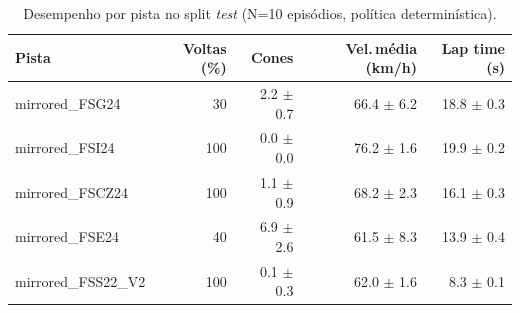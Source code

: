 \begin{table}[H]
\centering
\caption{Desempenho por pista no split \textit{test} (N=10 episódios, política determinística).}
\label{tab:per_track_test}
\begin{tabular}{lrrrr}
\toprule
\textbf{Pista} & \textbf{Voltas (\%)} & \textbf{Cones} & \textbf{Vel.\,m\'edia (km/h)} & \textbf{Lap time (s)} \\
\midrule
mirrored_FSG24 & 30 & 2.2 $\pm$ 0.7 & 66.4 $\pm$ 6.2 & 18.8 $\pm$ 0.3 \\
mirrored_FSI24 & 100 & 0.0 $\pm$ 0.0 & 76.2 $\pm$ 1.6 & 19.9 $\pm$ 0.2 \\
mirrored_FSCZ24 & 100 & 1.1 $\pm$ 0.9 & 68.2 $\pm$ 2.3 & 16.1 $\pm$ 0.3 \\
mirrored_FSE24 & 40 & 6.9 $\pm$ 2.6 & 61.5 $\pm$ 8.3 & 13.9 $\pm$ 0.4 \\
mirrored_FSS22_V2 & 100 & 0.1 $\pm$ 0.3 & 62.0 $\pm$ 1.6 & 8.3 $\pm$ 0.1 \\
\bottomrule
\end{tabular}
\end{table}
